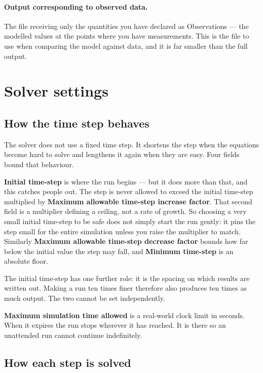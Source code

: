 \paragraph{Output corresponding to observed data.}
The file receiving only the quantities you have declared as Observations --- the
modelled values at the points where you have measurements. This is the file to
use when comparing the model against data, and it is far smaller than the full
output.

\section{Solver settings}

\subsection{How the time step behaves}

The solver does not use a fixed time step. It shortens the step when the
equations become hard to solve and lengthens it again when they are easy. Four
fields bound that behaviour.

\textbf{Initial time-step} is where the run begins --- but it does more than
that, and this catches people out. The step is never allowed to exceed the
initial time-step multiplied by \textbf{Maximum allowable time-step increase
factor}. That second field is a multiplier defining a ceiling, not a rate of
growth. So choosing a very small initial time-step to be safe does not simply
start the run gently: it pins the step small for the entire simulation unless
you raise the multiplier to match. Similarly \textbf{Maximum allowable
time-step decrease factor} bounds how far below the initial value the step may
fall, and \textbf{Minimum time-step} is an absolute floor.

The initial time-step has one further role: it is the spacing on which results
are written out. Making a run ten times finer therefore also produces ten times
as much output. The two cannot be set independently.

\textbf{Maximum simulation time allowed} is a real-world clock limit in
seconds. When it expires the run stops wherever it has reached. It is there so
an unattended run cannot continue indefinitely.

\subsection{How each step is solved}

